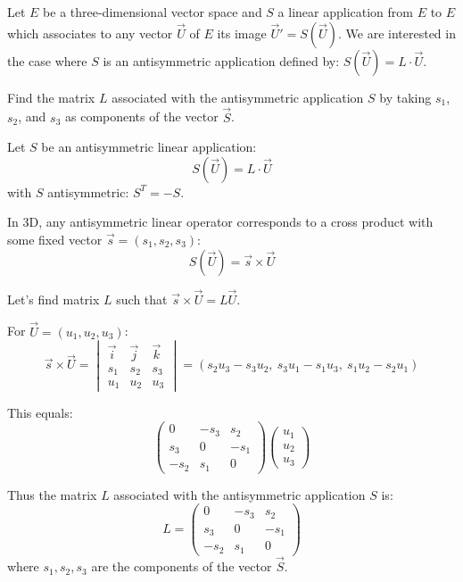 \documentclass[12pt]{article}
\begin{document}
\section{}

Let $E$ be a three-dimensional vector space and $S$ a linear application from $E$ to $E$ which associates to any vector $\vec{U}$ of $E$ its image $\vec{U}' = S(\vec{U})$. We are interested in the case where $S$ is an antisymmetric application defined by: $S(\vec{U}) = L \cdot \vec{U}$.

Find the matrix $L$ associated with the antisymmetric application $S$ by taking $s_1$, $s_2$, and $s_3$ as components of the vector $\vec{S}$.

\begin{correctionbox}
Let \(S\) be an antisymmetric linear application:
\[
S(\vec{U}) = L \cdot \vec{U}
\]
with \(S\) antisymmetric: \(S^T = -S\).

In 3D, any antisymmetric linear operator corresponds to a cross product with some fixed vector \(\vec{s} = (s_1, s_2, s_3)\):
\[
S(\vec{U}) = \vec{s} \times \vec{U}
\]

Let's find matrix \(L\) such that \(\vec{s} \times \vec{U} = L\vec{U}\).

For \(\vec{U} = (u_1, u_2, u_3)\):
\[
\vec{s} \times \vec{U} = 
\begin{vmatrix}
\vec{i} & \vec{j} & \vec{k} \\
s_1 & s_2 & s_3 \\
u_1 & u_2 & u_3
\end{vmatrix}
= (s_2 u_3 - s_3 u_2, \ s_3 u_1 - s_1 u_3, \ s_1 u_2 - s_2 u_1)
\]

This equals:
\[
\begin{pmatrix}
0 & -s_3 & s_2 \\
s_3 & 0 & -s_1 \\
-s_2 & s_1 & 0
\end{pmatrix}
\begin{pmatrix}
u_1 \\ u_2 \\ u_3
\end{pmatrix}
\]

Thus the matrix \(L\) associated with the antisymmetric application \(S\) is:
\[
\boxed{L = \begin{pmatrix}
0 & -s_3 & s_2 \\
s_3 & 0 & -s_1 \\
-s_2 & s_1 & 0
\end{pmatrix}}
\]
where \(s_1, s_2, s_3\) are the components of the vector \(\vec{S}\).
\end{correctionbox}
\end{document}
